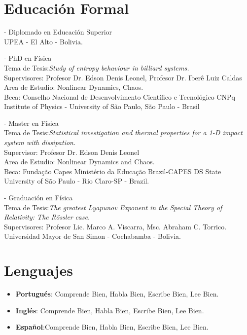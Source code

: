 \documentclass[margin,line]{resume}
\begin{document}
\begin{resume}
    \section{\mysidestyle Educación Formal}

 -  Diplomado en Educaci\'on Superior \\
           UPEA - El Alto - Bolivia.


 -  PhD en F\'isica \\
           Tema de Tesis:{\it Study of entropy behaviour in billiard systems.}\\
           Supervisores: { Profesor Dr. Edson Denis Leonel, Profesor Dr. Iber\^e Luiz Caldas}\\
           Area de Estudio: Nonlinear Dynamics, Chaos.\\
           Beca: Conselho Nacional de Desenvolvimento Cient\'ifico e Tecnol\'ogico CNPq
           Institute of Physics - University of S\~ao Paulo, S\~ao Paulo - Brasil


 - Master en F\'isica \\
           Tema de Tesis:{\it Statistical investigation and thermal properties for a 1-D impact system with dissipation.}\\
           Supervisor: { Profesor Dr. Edson Denis Leonel}\\
           Area de Estudio: Nonlinear Dynamics and Chaos.\\
           Beca: Funda\c c\~ao Capes Minist\'erio da Educa\c c\~ao Brazil-CAPES DS
           State University of S\~ao Paulo - Rio Claro-SP - Brazil.

 - Graduaci\'on en F\'isica\\
         Tema de Tesis:{\it The greatest Lyapunov Exponent in the Special Theory of Relativity: The R\"ossler case.}\\   
         Supervisores: Profesor Lic. Marco A. Viscarra, Msc. Abraham C. Torrico.\\
         Universidad Mayor de San Simon - Cochabamba - Bolivia.
    
\section{\mysidestyle Lenguajes}
\begin{itemize}
     \item {\bf Portugu\'es}: Comprende Bien, Habla Bien, Escribe Bien, Lee Bien.
     \item {\bf Ingl\'es}: Comprende Bien, Habla Bien, Escribe Bien, Lee Bien.
     \item {\bf Español}:Comprende Bien, Habla Bien, Escribe Bien, Lee Bien.
\end{itemize}


\end{resume}
\end{document}
